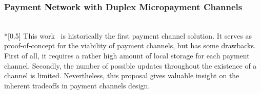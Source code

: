 \subsubsection{Payment Network with Duplex Micropayment Channels} \ \\*[0.5\baselineskip]
  This work~\cite{duplexchannels} is historically the first payment channel solution. It
  serves as proof-of-concept for the viability of payment channels, but has some
  drawbacks. First of all, it requires a rather high amount of local storage for each
  payment channel. Secondly, the number of possible updates throughout the existence of a
  channel is limited. Nevertheless, this proposal gives valuable insight on the inherent
  tradeoffs in payment channels design.
